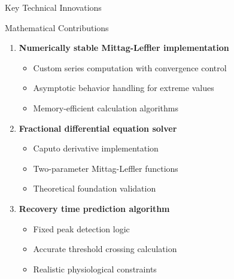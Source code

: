 \documentclass[aspectratio=169]{beamer}
\newcommand{\highlight}[1]{\textcolor{kentech_orange}{\textbf{#1}}}
\begin{document}
\begin{frame}{Key Technical Innovations}
    \begin{block}{Mathematical Contributions}
        \begin{enumerate}
            \item \highlight{Numerically stable Mittag-Leffler implementation}
                \begin{itemize}
                    \item Custom series computation with convergence control
                    \item Asymptotic behavior handling for extreme values
                    \item Memory-efficient calculation algorithms
                \end{itemize}
            
            \item \highlight{Fractional differential equation solver}
                \begin{itemize}
                    \item Caputo derivative implementation
                    \item Two-parameter Mittag-Leffler functions
                    \item Theoretical foundation validation
                \end{itemize}
            
            \item \highlight{Recovery time prediction algorithm}
                \begin{itemize}
                    \item Fixed peak detection logic
                    \item Accurate threshold crossing calculation
                    \item Realistic physiological constraints
                \end{itemize}
        \end{enumerate}
    \end{block}
\end{frame}
\end{document}
